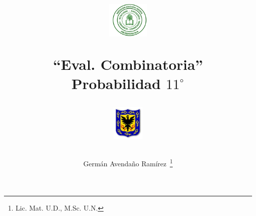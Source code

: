 \documentclass[10pt,addpoints]{exam}
\begin{document}
\title{\begin{minipage}{.2\textwidth}
        \includegraphics[height=1.75cm]{Images/logo-colegio.png}
       \end{minipage}
\begin{minipage}{.55\textwidth}
 \begin{center}
``Eval. Combinatoria''\\Probabilidad $11^{\circ}$
\end{center}
\end{minipage}
\begin{minipage}{.2\textwidth}
\includegraphics[height=1.75cm]{Images/logo-sed.png} 
\end{minipage}
}
\author{Germ\'{a}n Avendaño Ram\'{i}rez~\thanks{Lic. Mat. U.D., M.Sc. U.N.}}
\date{}
\maketitle
\vspace*{-.35in}
\begin{center}
\end{center}
\vspace{0.05in}
\end{document}
